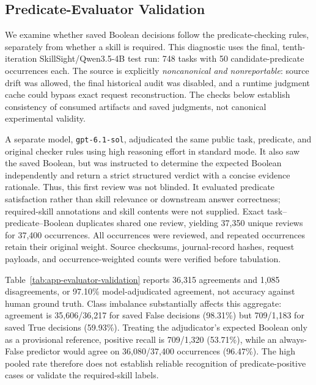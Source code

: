 \subsection{Predicate-Evaluator Validation}
\label{app:evaluator-validation}
We examine whether saved Boolean decisions follow the predicate-checking rules, separately from whether a skill is required. This diagnostic uses the final, tenth-iteration SkillSight/Qwen3.5-4B test run: 748 tasks with 50 candidate-predicate occurrences each. The source is explicitly \emph{noncanonical and nonreportable}: source drift was allowed, the final historical audit was disabled, and a runtime judgment cache could bypass exact request reconstruction. The checks below establish consistency of consumed artifacts and saved judgments, not canonical experimental validity.

A separate model, \texttt{gpt-6.1-sol}, adjudicated the same public task, predicate, and original checker rules using high reasoning effort in standard mode. It also saw the saved Boolean, but was instructed to determine the expected Boolean independently and return a strict structured verdict with a concise evidence rationale. Thus, this first review was not blinded. It evaluated predicate satisfaction rather than skill relevance or downstream answer correctness; required-skill annotations and skill contents were not supplied. Exact task--predicate--Boolean duplicates shared one review, yielding 37,350 unique reviews for 37,400 occurrences. All occurrences were reviewed, and repeated occurrences retain their original weight. Source checksums, journal-record hashes, request payloads, and occurrence-weighted counts were verified before tabulation.



Table~\ref{tab:app-evaluator-validation} reports 36,315 agreements and 1,085 disagreements, or 97.10\% model-adjudicated agreement, not accuracy against human ground truth. Class imbalance substantially affects this aggregate: agreement is 35,606/36,217 for saved False decisions (98.31\%) but 709/1,183 for saved True decisions (59.93\%). Treating the adjudicator's expected Boolean only as a provisional reference, positive recall is 709/1,320 (53.71\%), while an always-False predictor would agree on 36,080/37,400 occurrences (96.47\%). The high pooled rate therefore does not establish reliable recognition of predicate-positive cases or validate the required-skill labels.

